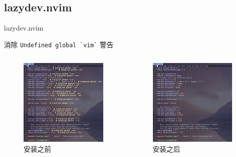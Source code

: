 \documentclass[aspectratio=169]{ctexbeamer}
\begin{document}
  \subsection{lazydev.nvim}
    \begin{frame}{lazydev.nvim}

      消除 \lstinline[basicstyle={\ttfamily\color[RGB]{249, 226, 175}}]{Undefined global `vim`} 警告

      \begin{columns}
        \begin{column}{0.5\linewidth}
          \begin{figure}[H]
            \centering
            \includegraphics[width=0.6\linewidth]{./Figures/Lazydev_Before.jpg}
            \caption{安装之前}
          \end{figure}
        \end{column}

        \begin{column}{0.5\linewidth}
          \begin{figure}[H]
            \centering
            \includegraphics[width=0.6\linewidth]{./Figures/Lazydev_After.jpg}
            \caption{安装之后}
          \end{figure}
        \end{column}
      \end{columns}
    \end{frame}
\end{document}
